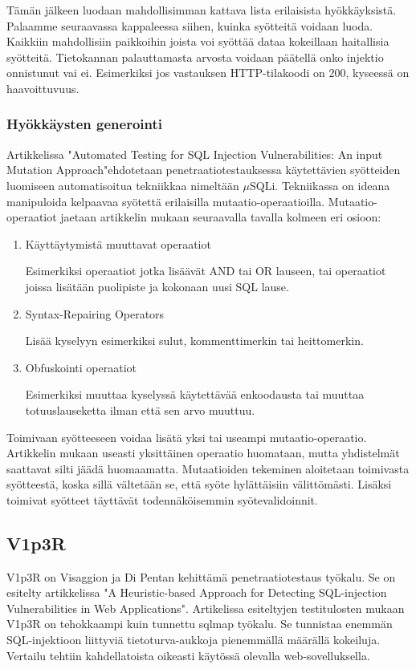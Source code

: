 \documentclass[finnish]{tktltiki2}
\theoremstyle{definition}
\theoremstyle{remark}
\begin{document}
	Tämän jälkeen luodaan mahdollisimman kattava lista erilaisista hyökkäyksistä. Palaamme seuraavassa kappaleessa siihen, kuinka syötteitä voidaan luoda. Kaikkiin mahdollisiin paikkoihin joista voi syöttää dataa kokeillaan haitallisia syötteitä. Tietokannan palauttamasta arvosta voidaan päätellä onko injektio onnistunut vai ei. Esimerkiksi jos vastauksen HTTP-tilakoodi on 200, kyseessä on haavoittuvuus. 
	
	\subsubsection{Hyökkäysten generointi}
	Artikkelissa "Automated Testing for SQL Injection Vulnerabilities: An input Mutation Approach"\cite{generation}\space ehdotetaan penetraatiotestauksessa käytettävien syötteiden luomiseen automatisoitua tekniikkaa nimeltään $\mu$SQLi. Tekniikassa on ideana manipuloida kelpaavaa syötettä erilaisilla mutaatio-operaatioilla. Mutaatio-operaatiot jaetaan artikkelin mukaan seuraavalla tavalla kolmeen eri osioon:
	\begin{enumerate}
	\item Käyttäytymistä muuttavat operaatiot
	
	Esimerkiksi operaatiot jotka lisäävät AND tai OR lauseen, tai operaatiot joissa lisätään puolipiste ja kokonaan uusi SQL lause. 
	
	\item Syntax-Repairing Operators
	
	Lisää kyselyyn esimerkiksi sulut, kommenttimerkin tai heittomerkin.
	
	\item Obfuskointi operaatiot
	
	Esimerkiksi muuttaa kyselyssä käytettävää enkoodausta tai muuttaa totuuslauseketta ilman että sen arvo muuttuu.
	\end{enumerate}
	
	Toimivaan syötteeseen voidaa lisätä yksi tai useampi mutaatio-operaatio. Artikkelin mukaan useasti yksittäinen operaatio huomataan, mutta yhdistelmät saattavat silti jäädä huomaamatta. Mutaatioiden tekeminen aloitetaan toimivasta syötteestä, koska sillä vältetään se, että syöte hylättäisiin välittömästi. Lisäksi toimivat syötteet täyttävät todennäköisemmin syötevalidoinnit. 
	
	\subsection{V1p3R}
	V1p3R on Visaggion ja Di Pentan kehittämä penetraatiotestaus työkalu. Se on esitelty artikkelissa "A Heuristic-based Approach for Detecting SQL-injection Vulnerabilities in Web Applications"\space\cite{viper}. Artikelissa esiteltyjen testitulosten mukaan V1p3R on tehokkaampi kuin tunnettu sqlmap työkalu. Se tunnistaa enemmän SQL-injektioon liittyviä tietoturva-aukkoja pienemmällä määrällä kokeiluja. Vertailu tehtiin kahdellatoista oikeasti käytössä olevalla web-sovelluksella.
	
\end{document}

